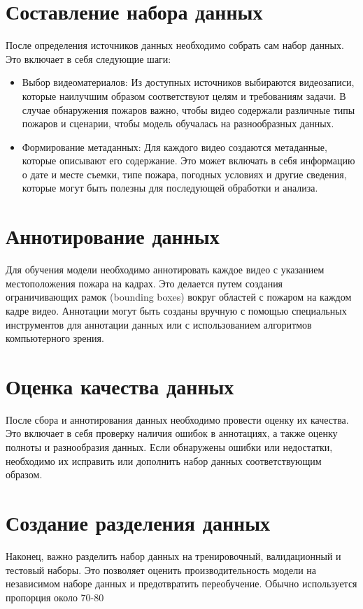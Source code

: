     \section{Составление набора данных}
    После определения источников данных необходимо собрать сам набор данных. Это включает в себя следующие шаги:
    \begin{itemize}
        \item Выбор видеоматериалов: Из доступных источников выбираются видеозаписи, которые наилучшим образом соответствуют целям и требованиям задачи. В случае обнаружения пожаров важно, чтобы видео содержали различные типы пожаров и сценарии, чтобы модель обучалась на разнообразных данных.
        \item Формирование метаданных: Для каждого видео создаются метаданные, которые описывают его содержание. Это может включать в себя информацию о дате и месте съемки, типе пожара, погодных условиях и другие сведения, которые могут быть полезны для последующей обработки и анализа.
    \end{itemize}

    \section{Аннотирование данных}
    Для обучения модели необходимо аннотировать каждое видео с указанием местоположения пожара на кадрах. Это делается путем создания ограничивающих рамок (bounding boxes) вокруг областей с пожаром на каждом кадре видео. Аннотации могут быть созданы вручную с помощью специальных инструментов для аннотации данных или с использованием алгоритмов компьютерного зрения.

    \section{Оценка качества данных}
    После сбора и аннотирования данных необходимо провести оценку их качества. Это включает в себя проверку наличия ошибок в аннотациях, а также оценку полноты и разнообразия данных. Если обнаружены ошибки или недостатки, необходимо их исправить или дополнить набор данных соответствующим образом.

    \section{Создание разделения данных}
    Наконец, важно разделить набор данных на тренировочный, валидационный и тестовый наборы. Это позволяет оценить производительность модели на независимом наборе данных и предотвратить переобучение. Обычно используется пропорция около 70-80%

